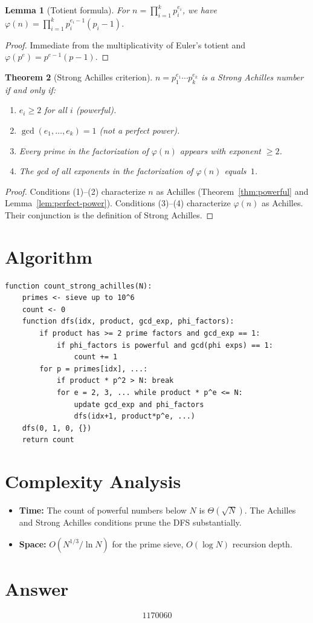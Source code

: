 \documentclass[12pt]{article}
\newtheorem{theorem}{Theorem}
\newtheorem{lemma}[theorem]{Lemma}
\begin{document}
\begin{lemma}[Totient formula]\label{lem:totient}
For $n = \prod_{i=1}^k p_i^{e_i}$, we have $\varphi(n) = \prod_{i=1}^{k} p_i^{e_i - 1}(p_i - 1)$.
\end{lemma}

\begin{proof}
Immediate from the multiplicativity of Euler's totient and $\varphi(p^e) = p^{e-1}(p-1)$.
\end{proof}

\begin{theorem}[Strong Achilles criterion]\label{thm:strong}
$n = p_1^{e_1}\cdots p_k^{e_k}$ is a Strong Achilles number if and only if:
\begin{enumerate}
    \item $e_i \ge 2$ for all $i$ (powerful).
    \item $\gcd(e_1, \ldots, e_k) = 1$ (not a perfect power).
    \item Every prime in the factorization of $\varphi(n)$ appears with exponent $\ge 2$.
    \item The gcd of all exponents in the factorization of $\varphi(n)$ equals~$1$.
\end{enumerate}
\end{theorem}

\begin{proof}
Conditions (1)--(2) characterize $n$ as Achilles (Theorem~\ref{thm:powerful} and Lemma~\ref{lem:perfect-power}). Conditions (3)--(4) characterize $\varphi(n)$ as Achilles. Their conjunction is the definition of Strong Achilles.
\end{proof}

\section{Algorithm}
\begin{verbatim}
function count_strong_achilles(N):
    primes <- sieve up to 10^6
    count <- 0
    function dfs(idx, product, gcd_exp, phi_factors):
        if product has >= 2 prime factors and gcd_exp == 1:
            if phi_factors is powerful and gcd(phi exps) == 1:
                count += 1
        for p = primes[idx], ...:
            if product * p^2 > N: break
            for e = 2, 3, ... while product * p^e <= N:
                update gcd_exp and phi_factors
                dfs(idx+1, product*p^e, ...)
    dfs(0, 1, 0, {})
    return count
\end{verbatim}

\section{Complexity Analysis}
\begin{itemize}
    \item \textbf{Time:} The count of powerful numbers below $N$ is $\Theta(\sqrt{N})$. The Achilles and Strong Achilles conditions prune the DFS substantially.
    \item \textbf{Space:} $O(N^{1/3}/\!\ln N)$ for the prime sieve, $O(\log N)$ recursion depth.
\end{itemize}

\section{Answer}

\[
\boxed{1170060}
\]
\end{document}

